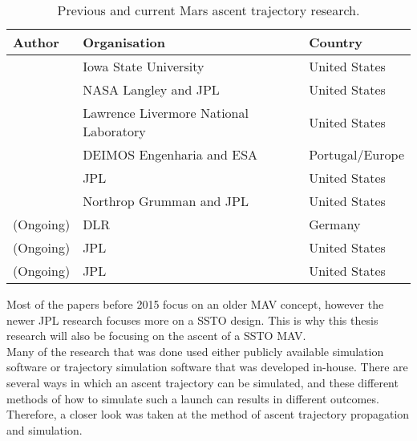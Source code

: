 \begin{table}[!ht]
\begin{center}
\caption{Previous and current Mars ascent trajectory research.}
\label{tab:referenceResearch}
\begin{tabular}{|l|l|l|}
\hline 
\textbf{Author} 	& \textbf{Organisation} & \textbf{Country} \\ \hline \hline
\cite{fanning1996model} & Iowa State University & United States\\ \hline
\cite{desai1998}& NASA Langley and \ac{JPL} & United States \\ \hline
\cite{whitehead2004mars,whitehead2005} & Lawrence Livermore National Laboratory & United States \\ \hline
 \cite{di2007system} & DEIMOS Engenharia and \acs{ESA} & Portugal/Europe \\ \hline
\cite{woolley2011mars} & \ac{JPL} & United States \\ \hline
\cite{trinidad2012} & Northrop Grumman and \ac{JPL} & United States  \\ \hline
\cite{dumont2015design} (Ongoing)& \ac{DLR} 		& Germany \\ \hline
\cite{woolley2015simple} (Ongoing) & \ac{JPL} & United States \\ \hline
\cite{benito2016trajectory} (Ongoing) & \ac{JPL} & United States \\ \hline

\end{tabular}
\end{center}
\end{table}

Most of the papers before 2015 focus on an older \ac{MAV} concept, however the newer \ac{JPL} research focuses more on a \ac{SSTO} design. This is why this thesis research will also be focusing on the ascent of a \ac{SSTO} \ac{MAV}. \\
Many of the research that was done used either publicly available simulation software or trajectory simulation software that was developed in-house. There are several ways in which an ascent trajectory can be simulated, and these different methods of how to simulate such a launch can results in different outcomes. Therefore, a closer look was taken at the method of ascent trajectory propagation and simulation.


